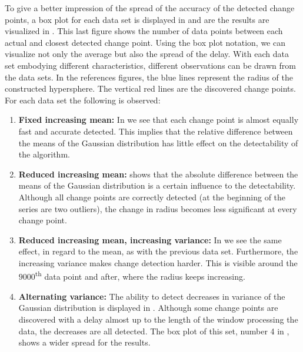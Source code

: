 To give a better impression of the spread of the accuracy of the detected change points, a box plot for each data set is displayed in  and are the results are visualized in .
This last figure shows the number of data points between each actual and closest detected change point.
Using the box plot notation, we can visualize not only the average but also the spread of the delay.
With each data set embodying different characteristics, different observations can be drawn from the data sets.
In the references figures, the blue lines represent the radius of the constructed hypersphere.
The vertical red lines are the discovered change points.
For each data set the following is observed:
\begin{enumerate}
  \item \textbf{Fixed increasing mean:} In  we see that each change point is almost equally fast and accurate detected.
  This implies that the relative difference between the means of the Gaussian distribution has little effect on the detectability of the algorithm.
  \item \textbf{Reduced increasing mean:}  shows that the absolute difference between the means of the Gaussian distribution is a certain influence to the detectability.
  Although all change points are correctly detected (at the beginning of the series are two outliers), the change in radius becomes less significant at every change point.
  \item \textbf{Reduced increasing mean, increasing variance:} In  we see the same effect, in regard to the mean, as with the previous data set.
  Furthermore, the increasing variance makes change detection harder.
  This is visible around the $9000$\textsuperscript{th} data point and after, where the radius keeps increasing.
  \item \textbf{Alternating variance:} The ability to detect decreases in variance of the Gaussian distribution is displayed in .
  Although some change points are discovered with a delay almost up to the length of the window processing the data, the decreases are all detected.
  The box plot of this set, number 4 in , shows a wider spread for the results.
\end{enumerate}


